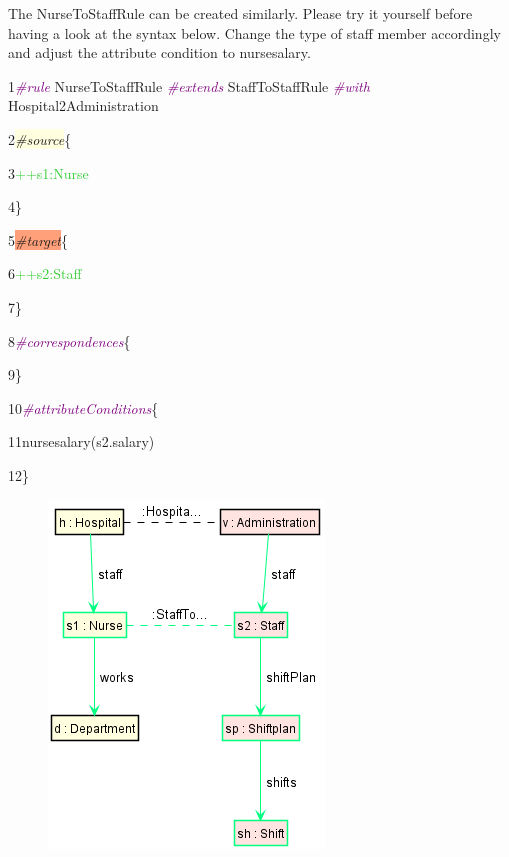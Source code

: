 \clearpage

The \textsf{NurseToStaffRule} can be created similarly. Please try it yourself before having a look at the syntax below. Change the type of staff member accordingly and adjust the attribute condition to \textsf{nursesalary}.\newline

{

1\hspace{0.5cm}\textcolor{Purple}{\textit{\#rule}} NurseToStaffRule \textcolor{Purple}{\textit{\#extends}} StaffToStaffRule \textcolor{Purple}{\textit{\#with}} Hospital2Administration

2\hspace{0.5cm}\colorbox{LightYellow}{\textit{\#source}}\{

3\hspace{1cm}\textcolor{LimeGreen}{++s1:Nurse}

4\hspace{0.5cm}\}

5\hspace{0.5cm}\colorbox{LightSalmon}{\textit{\#target}}\{

6\hspace{1cm}\textcolor{LimeGreen}{++s2:Staff}

7\hspace{0.5cm}\}

8\hspace{0.5cm}\textcolor{Purple}{\textit{\#correspondences}}\{

9\hspace{0.5cm}\}

10\hspace{0.42cm}\textcolor{Purple}{\textit{\#attributeConditions}}\{

11\hspace{1cm}nursesalary(s2.salary)

12\hspace{0.5cm}\}\newline

}

\begin{figure}[h]
    \centering
    \includegraphics[scale=0.65 ]{pictures/NurseToStaffRule.png}
    \caption{}
    \label{NurseToStaffRule}
\end{figure}

